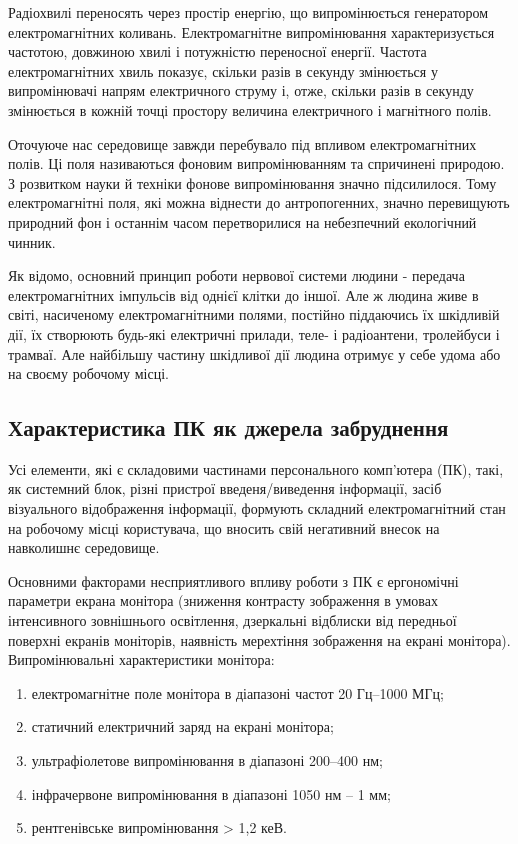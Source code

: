 Радіохвилі переносять через простір енергію, що випромінюється генератором електромагнітних коливань. Електромагнітне випромінювання характеризується частотою, довжиною хвилі і потужністю переносної енергії. Частота електромагнітних хвиль показує, скільки разів в секунду змінюється у випромінювачі напрям електричного струму і, отже, скільки разів в секунду змінюється в кожній точці простору величина електричного і магнітного полів.

Оточуюче нас середовище завжди перебувало під впливом електромагнітних полів. Ці поля називаються фоновим випромінюванням та спричинені природою. З розвитком науки й техніки фонове випромінювання значно підсилилося. Тому електромагнітні поля, які можна віднести до антропогенних, значно перевищують природний фон і останнім часом перетворилися на небезпечний екологічний чинник.

Як відомо, основний принцип роботи нервової системи людини - передача електромагнітних імпульсів від однієї клітки до іншої. Але ж людина живе в світі, насиченому електромагнітними полями, постійно піддаючись їх шкідливій дії, їх створюють будь-які електричні прилади, теле- і радіоантени, тролейбуси і трамваї. Але найбільшу частину шкідливої дії людина отримує у себе удома або на своєму робочому місці.

\subsection{Характеристика ПК як джерела забруднення}

Усі елементи, які є складовими частинами персонального комп’ютера (ПК), такі, як системний блок, різні пристрої введеня/виведення інформації, засіб візуального відображення інформації, формують складний електромагнітний стан на робочому місці користувача, що вносить свій негативний внесок на навколишнє середовище.

Основними факторами  несприятливого  впливу  роботи  з  ПК є ергономічні параметри екрана монітора (зниження   контрасту   зображення   в   умовах   інтенсивного   зовнішнього освітлення, дзеркальні відблиски від передньої поверхні екранів моніторів, наявність мерехтіння зображення на екрані монітора). Випромінювальні характеристики монітора:

\begin{enumerate}
\item електромагнітне поле монітора в діапазоні частот 20 Гц--1000 МГц;
\item статичний електричний заряд на екрані монітора;
\item ультрафіолетове випромінювання в діапазоні 200--400 нм;
\item інфрачервоне випромінювання в діапазоні 1050 нм -- 1 мм;
\item рентгенівське випромінювання > 1,2 кеВ.
\end{enumerate}


